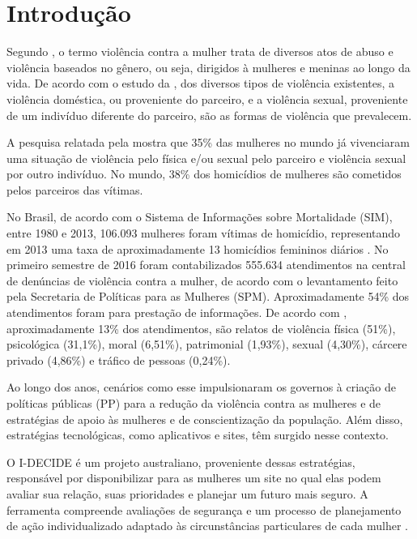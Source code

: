 \chapter[Introdução]{Introdução}

Segundo , o termo violência contra a mulher trata de
diversos atos de abuso e violência baseados no gênero, ou seja, dirigidos à mulheres e meninas ao longo da vida.
De acordo com o estudo da , dos diversos tipos de violência existentes, a violência doméstica, ou proveniente do parceiro,
e a violência sexual, proveniente de um indivíduo diferente do parceiro, são as formas de violência que prevalecem.

A pesquisa relatada pela  mostra que 35\% das mulheres no mundo já vivenciaram uma situação
de violência pelo física e/ou sexual pelo parceiro e violência sexual por outro indivíduo. No mundo, 38\% dos homicídios de mulheres são cometidos pelos parceiros das vítimas.

No Brasil, de acordo com o Sistema de Informações sobre Mortalidade (SIM), entre 1980 e 2013, 106.093 mulheres foram vítimas de homicídio, representando em 2013 uma taxa de aproximadamente 13 homicídios femininos
diários \cite{mapa_violencia_2015}. 
No primeiro semestre de 2016 foram contabilizados 555.634 atendimentos na central de denúncias 
de violência contra a mulher, de acordo com o levantamento feito pela Secretaria de Políticas para as Mulheres (SPM). 
Aproximadamente 54\% dos atendimentos foram para prestação de informações. De acordo com \cite{portal_180}, aproximadamente 13\% dos atendimentos, são relatos de violência física (51\%), psicológica (31,1\%), moral (6,51\%), patrimonial (1,93\%), sexual (4,30\%), cárcere privado (4,86\%) e tráfico de pessoas (0,24\%).

Ao longo dos anos, cenários como esse impulsionaram os governos à criação de políticas públicas (PP) para a redução da violência contra as mulheres e de estratégias de apoio às mulheres e de conscientização da população. Além disso, estratégias tecnológicas, como aplicativos e sites, têm surgido nesse contexto.

O I-DECIDE é um projeto australiano, proveniente dessas estratégias, responsável por disponibilizar para as mulheres um site no qual elas podem avaliar sua relação, suas prioridades e planejar um futuro mais seguro. A ferramenta compreende avaliações de segurança e um processo de planejamento de ação individualizado adaptado às circunstâncias particulares de cada mulher \cite{idecide}.


